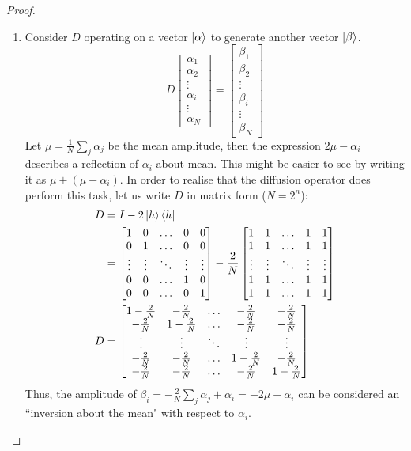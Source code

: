 \begin{proof}
\begin{enumerate}
        \item Consider $D$ operating on a vector $\ket{\alpha}$ to generate another vector $\ket{\beta}$.
        \[
        D\begin{bmatrix}\alpha_1 \\ \alpha_2 \\ \vdots \\ \alpha_i \\ \vdots \\\alpha_N \end{bmatrix} = \begin{bmatrix} \beta_1\\ \beta_2 \\ \vdots \\\beta_i \\ \vdots \\ \beta_N \end{bmatrix}
        \]
        Let $\mu=\frac{1}{N}\sum_j\alpha_j$ be the mean amplitude, then the expression $2\mu-\alpha_i$ describes a reflection of $\alpha_i$ about mean. This might be easier to see by writing it as $\mu + (\mu -\alpha_i)$. In order to realise that the diffusion operator does perform this task, let us write $D$ in matrix form ($N=2^n$):
        \begin{align*}
        D&=I-2\ket{h}\bra{h}\\
        &=\begin{bmatrix} 1 & 0 & \ldots & 0 & 0 \\0 & 1 & \ldots & 0 & 0 \\ \vdots & \vdots &  \ddots & \vdots &\vdots \\0 & 0 & \ldots & 1 & 0 \\ 0 & 0 & \ldots & 0 & 1  \end{bmatrix} - \frac{2}{N}\begin{bmatrix} 1 & 1 & \ldots & 1 & 1 \\ 1 & 1 & \ldots & 1 & 1 \\\vdots & \vdots & \ddots & \vdots & \vdots \\ 1 & 1 & \ldots & 1 & 1 \\1 & 1 & \ldots & 1 & 1 \end{bmatrix} \\
        D&=\begin{bmatrix} 1 - \frac{2}{N}& -\frac{2}{N} & \ldots & -\frac{2}{N} & -\frac{2}{N} \\-\frac{2}{N} & 1-\frac{2}{N} & \ldots & -\frac{2}{N} & -\frac{2}{N} \\ \vdots & \vdots &  \ddots & \vdots &\vdots \\-\frac{2}{N} & -\frac{2}{N} & \ldots & 1-\frac{2}{N} & -\frac{2}{N} \\ -\frac{2}{N} & -\frac{2}{N} & \ldots & -\frac{2}{N} & 1-\frac{2}{N}  \end{bmatrix}
        \end{align*}
        Thus, the amplitude of $\beta_i=-\frac{2}{N}\sum_j\alpha_j+\alpha_i=-2\mu+\alpha_i$ can be considered an ``inversion about the mean" with respect to $\alpha_i$.
    \end{enumerate}
\end{proof}
